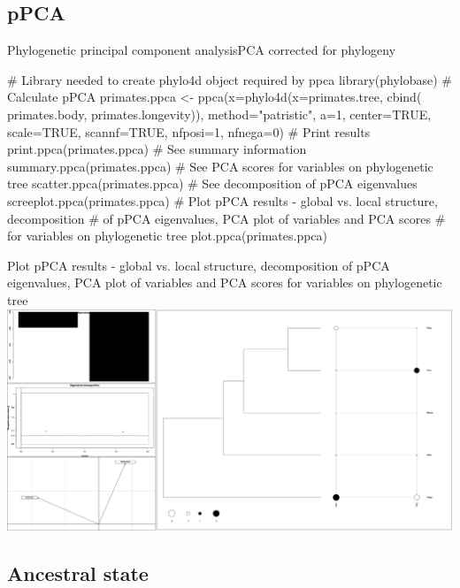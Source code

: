\documentclass[compress, ucs, xelatex, 11pt, xcolor=svgnames,
  hyperref={
    bookmarks=true,
    unicode=true,
    colorlinks=true,
    pdftitle={Molecular data in R},
    plainpages=false,
    pdfauthor={Vojtech Zeisek},
    pdfsubject={Course about phylogeny and evolution in R},
    pdfcreator={XeLaTeX},
    pdfkeywords={R, evolution, phylogeny, molecular data},
    linkcolor=Tomato,
    anchorcolor=SaddleBrown,
    citecolor=Goldenrod,
    filecolor=DarkMagenta,
    menucolor=Sienna,
    urlcolor=DarkTurquoise,
    pdftex},
  url={hyphens, lowtilde} %
  ]{beamer}
\begin{document}
\subsection{pPCA} %

\begin{frame}[fragile]{Phylogenetic principal component analysis}{PCA corrected for phylogeny}
  \begin{spluscode}
    # Library needed to create phylo4d object required by ppca
    library(phylobase)
    # Calculate pPCA
    primates.ppca <- ppca(x=phylo4d(x=primates.tree, cbind(
      primates.body, primates.longevity)), method="patristic",
      a=1, center=TRUE, scale=TRUE, scannf=TRUE, nfposi=1, nfnega=0)
    # Print results
    print.ppca(primates.ppca)
    # See summary information
    summary.ppca(primates.ppca)
    # See PCA scores for variables on phylogenetic tree
    scatter.ppca(primates.ppca)
    # See decomposition of pPCA eigenvalues
    screeplot.ppca(primates.ppca)
    # Plot pPCA results - global vs. local structure, decomposition
    # of pPCA eigenvalues, PCA plot of variables and PCA scores
    # for variables on phylogenetic tree
    plot.ppca(primates.ppca)
  \end{spluscode}
\end{frame}

\begin{frame}{Plot pPCA results - global vs. local structure, decomposition of pPCA eigenvalues, PCA plot of variables and PCA scores for variables on phylogenetic tree}
\includegraphics[width=\textwidth]{ppca.png}
\end{frame}

\subsection{Ancestral state}
\end{document}
